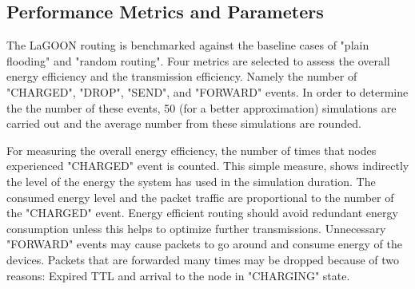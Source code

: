 \documentclass[12pt, oneandhalf, chaparabic, sees, ms]{metu}
\begin{document}





  \newpage
\subsection{Performance Metrics and Parameters}\label{ssmetrics}
The LaGOON routing is benchmarked against the baseline cases of "plain flooding" and "random routing".
Four metrics are selected to assess the overall energy efficiency and the transmission efficiency. Namely the number of "CHARGED", "DROP", "SEND", and 
"FORWARD" events. In order to determine the the number of these events, 50 (for a better approximation) simulations are carried out and the average number from these simulations are
rounded. 

For measuring the overall energy efficiency, the number of times that 
nodes experienced "CHARGED" event is counted. This simple measure, shows indirectly the level of the energy the system has used 
in the simulation duration. The consumed energy level and the packet traffic are proportional to the number of the "CHARGED" event. 
Energy efficient routing should avoid redundant energy consumption unless this helps to optimize further 
transmissions. Unnecessary "FORWARD" events may cause packets to go around and consume energy of the devices.
Packets that are forwarded many times may be dropped because of two reasons: Expired TTL and arrival to the node in "CHARGING" state.
\end{document}
